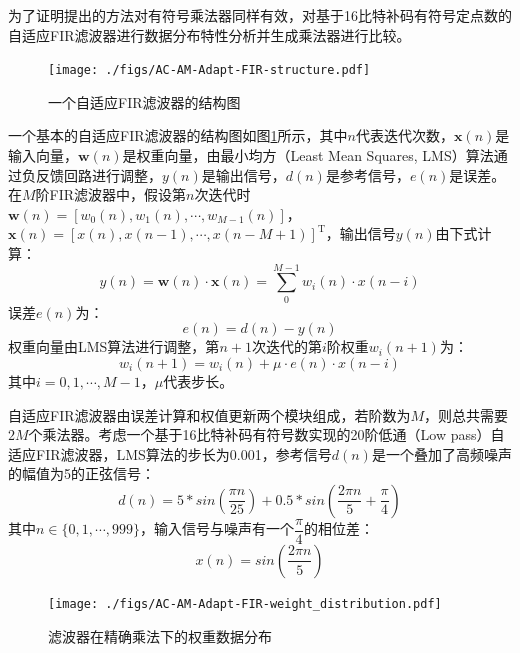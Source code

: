 为了证明提出的方法对有符号乘法器同样有效，对基于16比特补码有符号定点数的自适应FIR滤波器进行数据分布特性分析并生成乘法器进行比较。
\begin{figure}[!ht]
    \centering
    \texttt{[image: ./figs/AC-AM-Adapt-FIR-structure.pdf]}
    \caption{一个自适应FIR滤波器的结构图}
    \label{AC:AM:Adapt:FIR:Fig:structure}
\end{figure}
一个基本的自适应FIR滤波器的结构图如图\ref{AC:AM:Adapt:FIR:Fig:structure}所示，其中$n$代表迭代次数，$\boldsymbol{x}(n)$是输入向量，$\boldsymbol{w}(n)$是权重向量，由最小均方（Least Mean Squares, LMS）算法通过负反馈回路进行调整，$y(n)$是输出信号，$d(n)$是参考信号，$e(n)$是误差。
在$M$阶FIR滤波器中，假设第$n$次迭代时$\boldsymbol{w}(n) = [w_0(n), w_1(n), \cdots , w_{M-1}(n)]$，$\boldsymbol{x}(n) = [x(n), x(n-1), \cdots , x(n-M+1)]^\mathrm{T}$，输出信号$y(n)$由下式计算：
\begin{equation}
    \label{AC:AM:Adapt:FIR:Eq:yn}
    y(n) = \boldsymbol{w}(n) \cdot \boldsymbol{x}(n) = \sum_{0}^{M-1} w_i(n) \cdot x(n-i)
\end{equation}
误差$e(n)$为：
\begin{equation}
    \label{AC:AM:Adapt:FIR:Eq:en}
    e(n) = d(n) - y(n)
\end{equation}
权重向量由LMS算法进行调整，第$n+1$次迭代的第$i$阶权重$w_i (n+1)$为：
\begin{equation}
    \label{AC:AM:Adapt:FIR:Eq:LMS}
    w_i(n+1) = w_i(n) + \mu \cdot e(n) \cdot x(n-i)
\end{equation}
其中$i=0, 1, \cdots , M-1$，$\mu$代表步长。

自适应FIR滤波器由误差计算和权值更新两个模块组成，若阶数为$M$，则总共需要$2M$个乘法器。考虑一个基于16比特补码有符号数实现的20阶低通（Low pass）自适应FIR滤波器，LMS算法的步长为0.001，参考信号$d(n)$是一个叠加了高频噪声的幅值为5的正弦信号：
\begin{equation}
    \label{AC:AM:Adapt:FIR:Eq:dn}
    d(n) = 5 * sin ( \frac{\pi n}{25} ) + 0.5 * sin ( \frac{2 \pi n}{5}  + \frac{\pi}{4} )
\end{equation}
其中$n \in \{0, 1, \cdots, 999\}$，输入信号与噪声有一个$\dfrac{\pi}{4}$的相位差：
\begin{equation}
    \label{AC:AM:Adapt:FIR:Eq:xn}
    x(n) = sin ( \frac{2 \pi n}{5} )
\end{equation}

\begin{figure}[!ht]
    \centering
    \texttt{[image: ./figs/AC-AM-Adapt-FIR-weight\_distribution.pdf]}
    \caption{滤波器在精确乘法下的权重数据分布}
    \label{AC:AM:Adapt:FIR:Fig:weight_distribution}
\end{figure}

